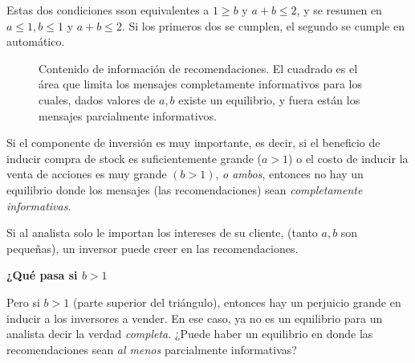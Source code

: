 \documentclass[12pt]{article}
\begin{document}
Estas dos condiciones sson equivalentes a $ 1 \geq b $ y $ a+b \leq 2 $, y se resumen en $ a \leq 1, b \leq 1 $ y $a+b\leq 2 $. Si los primeros dos se cumplen, el segundo se cumple en automático.

\begin{figure}[H]
	\centering
	
	\caption{Contenido de información de recomendaciones. El cuadrado es el área que limita los mensajes completamente informativos para los cuales, dados valores de $ a,b$ existe un equilibrio, y fuera están los mensajes parcialmente informativos.}
\end{figure}

Si el componente de inversión es muy importante, es decir, si el beneficio de inducir compra de stock es suficientemente grande ($ a>1 $) o el costo de inducir la venta de acciones es muy grande $ (b > 1) $, \textit{o ambos}, entonces no hay un equilibrio donde los mensajes (las recomendaciones) sean \textit{completamente informativas}. 

Si al analista solo le importan los intereses de su cliente, (tanto $ a ,b $ son pequeñas), un inversor puede creer en las recomendaciones.

\textbf{¿Qué pasa si $ b >1 $}

Pero si $ b>1 $ (parte superior del triángulo), entonces hay un perjuicio grande en inducir a los inversores a vender. En ese caso, ya no es un equilibrio para un analista decir la verdad \textit{completa}. ¿Puede haber un equilibrio en donde las recomendaciones sean \textit{al menos} parcialmente informativas?

\end{document}
